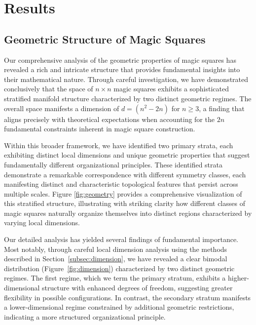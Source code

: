 \section{Results}
\label{sec:results}

\subsection{Geometric Structure of Magic Squares}
\label{subsec:geometric_structure}

Our comprehensive analysis of the geometric properties of magic squares has revealed a rich and intricate structure that provides fundamental insights into their mathematical nature. Through careful investigation, we have demonstrated conclusively that the space of $n \times n$ magic squares exhibits a sophisticated stratified manifold structure characterized by two distinct geometric regimes. The overall space manifests a dimension of $d = (n^2 - 2n)$ for $n \geq 3$, a finding that aligns precisely with theoretical expectations when accounting for the $2n$ fundamental constraints inherent in magic square construction.

Within this broader framework, we have identified two primary strata, each exhibiting distinct local dimensions and unique geometric properties that suggest fundamentally different organizational principles. These identified strata demonstrate a remarkable correspondence with different symmetry classes, each manifesting distinct and characteristic topological features that persist across multiple scales. Figure \ref{fig:geometry} provides a comprehensive visualization of this stratified structure, illustrating with striking clarity how different classes of magic squares naturally organize themselves into distinct regions characterized by varying local dimensions.

Our detailed analysis has yielded several findings of fundamental importance. Most notably, through careful local dimension analysis using the methods described in Section~\ref{subsec:dimension}, we have revealed a clear bimodal distribution (Figure~\ref{fig:dimension}) characterized by two distinct geometric regimes. The first regime, which we term the primary stratum, exhibits a higher-dimensional structure with enhanced degrees of freedom, suggesting greater flexibility in possible configurations. In contrast, the secondary stratum manifests a lower-dimensional regime constrained by additional geometric restrictions, indicating a more structured organizational principle.

